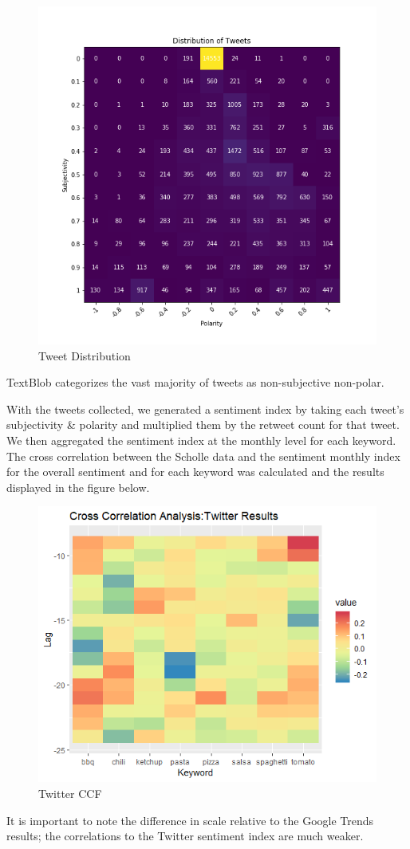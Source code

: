 \documentclass[12pt,oneside]{chicagocapstone}
\begin{document}
\begin{figure}
\centering
\includegraphics{./figure/Tweet_Distribution.png}
\caption{Tweet Distribution}
\end{figure}
TextBlob categorizes the vast majority of tweets as non-subjective
non-polar.

With the tweets collected, we generated a sentiment index by taking each
tweet's subjectivity \& polarity and multiplied them by the retweet
count for that tweet. We then aggregated the sentiment index at the
monthly level for each keyword. The cross correlation between the
Scholle data and the sentiment monthly index for the overall sentiment
and for each keyword was calculated and the results displayed in the
figure below.
\begin{figure}
\centering
\includegraphics{./figure/CCF_Twitter_Results.png}
\caption{Twitter CCF}
\end{figure}
It is important to note the difference in scale relative to the Google
Trends results; the correlations to the Twitter sentiment index are much
weaker.
\end{document}
